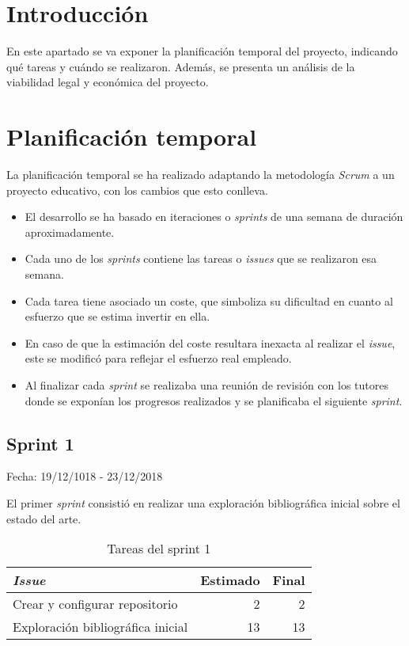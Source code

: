 
\section{Introducción}

En este apartado se va exponer la planificación temporal del proyecto, indicando qué tareas y cuándo se realizaron. Además, se presenta un análisis de la viabilidad legal y económica del proyecto. 

\section{Planificación temporal}

La planificación temporal se ha realizado adaptando la metodología \textit{Scrum} a un proyecto educativo, con los cambios que esto conlleva.

\begin{itemize}
	\item El desarrollo se ha basado en iteraciones o \textit{sprints} de una semana de duración aproximadamente.
	\item  Cada uno de los \textit{sprints} contiene las tareas o \textit{issues} que se realizaron esa semana. 
	\item Cada tarea tiene asociado un coste, que simboliza su dificultad en cuanto al esfuerzo que se estima invertir en ella.
	\item En caso de que la estimación del coste resultara inexacta al realizar el \textit{issue}, este se modificó para reflejar el esfuerzo real empleado.
	\item Al finalizar cada \textit{sprint} se realizaba una reunión de revisión con los tutores donde se exponían los progresos realizados y se planificaba el siguiente \textit{sprint}.
\end{itemize}

\subsection{Sprint 1}

Fecha: 19/12/1018 - 23/12/2018

El primer \textit{sprint} consistió en realizar una exploración bibliográfica inicial sobre el estado del arte. 

\begin{table}[H]
	 \begin{tabularx}{\linewidth}{X r r}
	 	\toprule \textbf{\textit{Issue}} & \textbf{Estimado} & \textbf{Final}\\
	 	\toprule
	 	Crear y configurar repositorio & 2 & 2 \\
	 	Exploración bibliográfica inicial & 13 & 13 \\
	 	\bottomrule
	 \end{tabularx}
	 \caption{Tareas del sprint 1}
\end{table}


